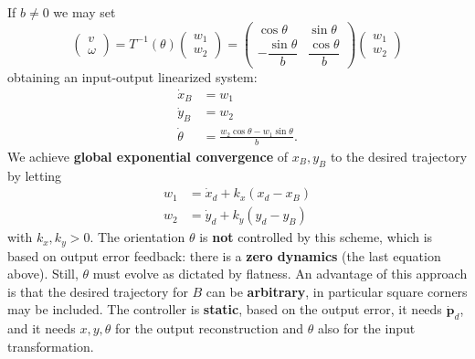 \documentclass[10pt, a4paper]{report}
\begin{document}
If $b\neq 0$ we may set\begin{equation}
    \begin{pmatrix}
        v\\ \omega
    \end{pmatrix}=T^{-1}(\theta)\begin{pmatrix}
        w_1\\ w_2
    \end{pmatrix}=\begin{pmatrix}
        \cos\theta&\sin\theta\\-\dfrac{\sin\theta}{b}&\dfrac{\cos\theta}{b}
    \end{pmatrix}\begin{pmatrix}
        w_1\\ w_2
    \end{pmatrix}
\end{equation}
obtaining an input-output linearized system:\begin{align}
    \dot x_B&=w_1\\
    \dot y_B&=w_2\\
    \dot\theta&=\frac{w_2\cos\theta-w_1\sin\theta}{b}.
\end{align}
We achieve \textbf{global exponential convergence} of $x_B,y_B$ to the desired trajectory by letting\begin{align}
    w_1&=\dot x_d+k_x(x_d-x_B)\\
    w_2&=\dot y_d+k_y(y_d-y_B)
\end{align}
with $k_x,k_y>0$. The orientation $\theta$ is \textbf{not} controlled by this scheme, which is based on output error feedback: there is a \textbf{zero dynamics} (the last equation above). Still, $\theta$ must evolve as dictated by flatness. An advantage of this approach is that the desired trajectory for $B$ can be \textbf{arbitrary}, in particular square corners may be included. The controller is \textbf{static}, based on the output error, it needs $\dot{\mathbf p}_d$, and it needs $x,y,\theta$ for the output reconstruction and $\theta$ also for the input transformation.
\end{document}
